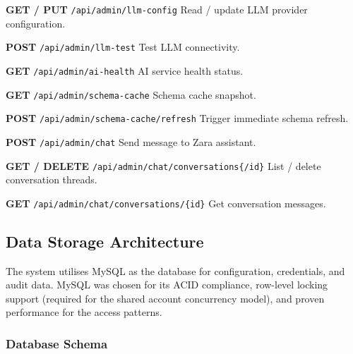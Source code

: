 \begin{tcolorbox}[colback=red!5, colframe=red!50, title=\textbf{AI, LLM, and Chat Endpoints (Super Admin)}]

\textbf{GET / PUT} \texttt{/api/admin/llm-config} \quad Read / update LLM provider configuration.

\vspace{0.2cm}

\textbf{POST} \texttt{/api/admin/llm-test} \quad Test LLM connectivity.

\vspace{0.2cm}

\textbf{GET} \texttt{/api/admin/ai-health} \quad AI service health status.

\vspace{0.2cm}

\textbf{GET} \texttt{/api/admin/schema-cache} \quad Schema cache snapshot.

\vspace{0.2cm}

\textbf{POST} \texttt{/api/admin/schema-cache/refresh} \quad Trigger immediate schema refresh.

\vspace{0.2cm}

\textbf{POST} \texttt{/api/admin/chat} \quad Send message to Zara assistant.

\vspace{0.2cm}

\textbf{GET / DELETE} \texttt{/api/admin/chat/conversations\{/id\}} \quad List / delete conversation threads.

\vspace{0.2cm}

\textbf{GET} \texttt{/api/admin/chat/conversations/\{id\}} \quad Get conversation messages.

\end{tcolorbox}

\subsection{Data Storage Architecture}

The system utilises MySQL as the database for configuration, credentials, and audit data. MySQL was chosen for its ACID compliance, row-level locking support (required for the shared account concurrency model), and proven performance for the access patterns.

\subsubsection{Database Schema}

